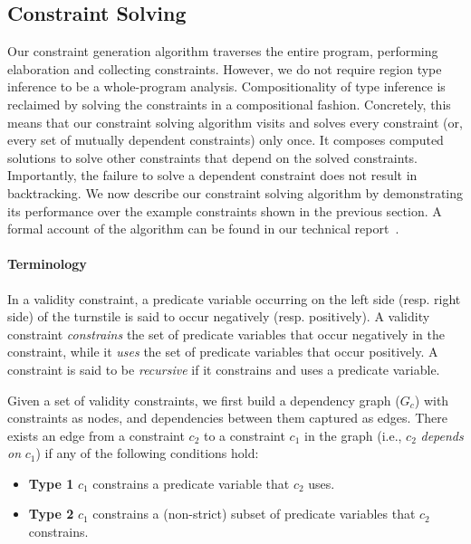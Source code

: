 \subsection{Constraint Solving}
\label{sec:fb-constraintsolving}

Our constraint generation algorithm traverses the entire program,
performing elaboration and collecting constraints. However, we do not
require region type inference to be a whole-program analysis.
Compositionality of type inference is reclaimed by solving the
constraints in a compositional fashion. Concretely, this means that
our constraint solving algorithm visits and solves every constraint
(or, every set of mutually dependent constraints) only once. It
composes computed solutions to solve other constraints that depend on
the solved constraints. Importantly, the failure to solve a dependent
constraint does not result in backtracking. We now describe our
constraint solving algorithm by demonstrating its performance over the
example constraints shown in the previous section. A formal account of
the algorithm can be found in our technical report~\cite{techrep}.

\paragraph{Terminology} In a validity constraint, a predicate variable
occurring on the left side (resp. right side) of the turnstile is said
to occur negatively (resp. positively). A validity constraint
\emph{constrains} the set of predicate variables that occur negatively
in the constraint, while it \emph{uses} the set of predicate variables
that occur positively. A constraint is said to be \emph{recursive} if
it constrains and uses a predicate variable.

Given a set of validity constraints, we first build a dependency graph
($G_c$) with constraints as nodes, and dependencies between them
captured as edges. There exists an edge from a constraint $c_2$ to a
constraint $c_1$ in the graph (i.e., $c_2$ \emph{depends on} $c_1$) if
any of the following conditions hold:
\begin{itemize}
\item \textbf{Type 1} $c_1$ constrains a predicate variable that $c_2$ uses. 
\item \textbf{Type 2} $c_1$ constrains a (non-strict) subset of predicate variables
that $c_2$ constrains.
\end{itemize}

